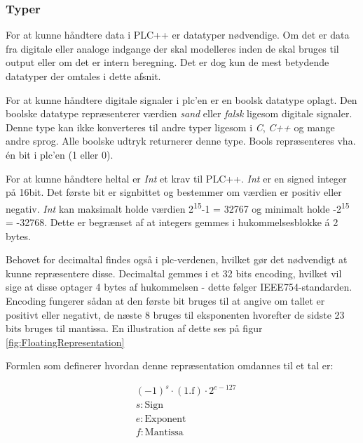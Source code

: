 \subsubsection{Typer}
For at kunne håndtere data i PLC++ er datatyper nødvendige. Om det er data fra digitale eller analoge indgange der skal modelleres inden de skal bruges til output eller om det er intern beregning. Det er dog kun de mest betydende datatyper der omtales i dette afsnit.

For at kunne håndtere digitale signaler i \gls{plc}'en er en boolsk datatype oplagt. Den boolske datatype repræsenterer værdien \textit{sand} eller \textit{falsk} ligesom digitale signaler. Denne type kan ikke konverteres til andre typer ligesom i \textit{C}, \textit{C++} og mange andre sprog. Alle boolske udtryk returnerer denne type. Bools repræsenteres vha. én bit i \gls{plc}'en (1 eller 0). 

For at kunne håndtere heltal er \textit{Int} et krav til PLC++. \textit{Int} er en signed integer på 16bit. Det første bit er signbittet og bestemmer om værdien er positiv eller negativ. \textit{Int} kan maksimalt holde værdien 2\textsuperscript{15}-1 = 32767 og minimalt holde -2\textsuperscript{15} = -32768. Dette er begrænset af at integers gemmes i hukommelsesblokke á 2 bytes.

Behovet for decimaltal findes også i \gls{plc}-verdenen, hvilket gør det nødvendigt at kunne repræsentere disse. Decimaltal gemmes i et 32 bits encoding, hvilket vil sige at disse optager 4 bytes af hukommelsen - dette følger IEEE754-standarden. Encoding fungerer sådan at den første bit bruges til at angive om tallet er positivt eller negativt, de næste 8 bruges til eksponenten hvorefter de sidste 23 bits bruges til mantissa. En illustration af dette ses på figur \ref{fig:FloatingRepresentation}


Formlen som definerer hvordan denne repræsentation omdannes til et tal er:

\begin{align*}
&(-1)^s \cdot (1.\text{f}) \cdot 2^{e-127} \\
&s: \text{Sign}\\
&e: \text{Exponent}\\
&f: \text{Mantissa}
\end{align*}

